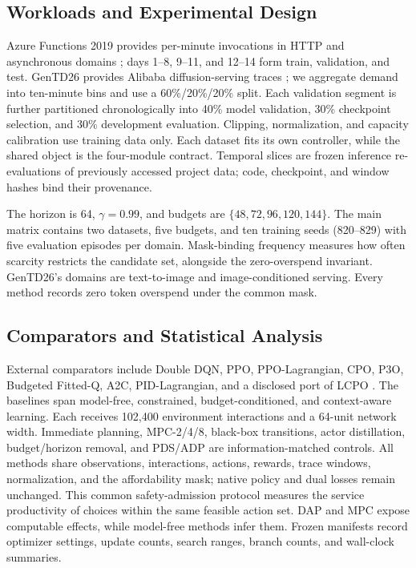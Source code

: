 \documentclass[acmsmall,screen,review,anonymous]{acmart}
\begin{document}
\subsection{Workloads and Experimental Design}

Azure Functions 2019 provides per-minute invocations in HTTP and
asynchronous domains \cite{azurefunctions2019,shahrad2020serverless}; days 1--8,
9--11, and 12--14 form train, validation, and test. GenTD26 provides Alibaba
diffusion-serving traces \cite{lin2025gentd}; we aggregate demand into ten-minute
bins and use a 60\%/20\%/20\% split. Each validation segment is further
partitioned chronologically into 40\% model validation, 30\% checkpoint
selection, and 30\% development evaluation. Clipping, normalization, and
capacity calibration use training data only. Each dataset fits its own
controller, while the shared object is the four-module contract. Temporal slices
are frozen inference re-evaluations of previously accessed project data; code,
checkpoint, and window hashes bind their provenance.

The horizon is 64, \(\gamma=0.99\), and budgets are
\(\{48,72,96,120,144\}\).  The main matrix contains two datasets, five budgets,
and ten training seeds (820--829) with five evaluation episodes per domain.
Mask-binding frequency measures how often scarcity restricts the candidate
set, alongside the zero-overspend invariant.
GenTD26's domains are text-to-image and image-conditioned serving. Every
method records zero token overspend under the common mask.

\subsection{Comparators and Statistical Analysis}

External comparators include Double DQN, PPO, PPO-Lagrangian, CPO, P3O,
Budgeted Fitted-Q, A2C, PID-Lagrangian, and a disclosed port of LCPO
\cite{vanhasselt2016double,schulman2017ppo,achiam2017cpo,stooke2020pid,zhang2022p3o,carrara2019budgeted,hamadanian2025lcpo}.
The baselines span model-free, constrained, budget-conditioned, and
context-aware learning. Each receives 102,400 environment interactions and
a 64-unit network width. Immediate planning, MPC-2/4/8, black-box transitions,
actor distillation, budget/horizon removal, and PDS/ADP are information-matched
controls. All methods share observations, interactions, actions, rewards, trace
windows, normalization, and the affordability mask; native policy and dual
losses remain unchanged. This common safety-admission protocol measures the service productivity
of choices within the same feasible action set. DAP
and MPC expose computable effects, while model-free methods infer them. Frozen
manifests record optimizer settings, update counts, search ranges, branch
counts, and wall-clock summaries.
\end{document}
